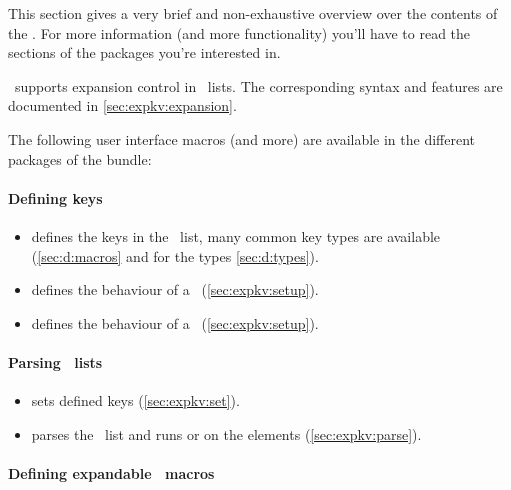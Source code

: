 
This section gives a very brief and non-exhaustive overview over the contents of
the \expkvbundle. For more information (and more functionality) you'll have to
read the sections of the packages you're interested in.

\expkvbundle\ supports expansion control in \kv\ lists. The corresponding
syntax and features are documented in \autoref{sec:expkv:expansion}.

The following user interface macros (and more) are available in the different
packages of the bundle:
\paragraph{Defining keys}
\begin{itemize}
  \item {}\texttt{\kvarg}
    defines the keys in the \kv\ list, many common key types are available
    (\autoref{sec:d:macros} and for the types \autoref{sec:d:types}).
  \item {}
    defines the behaviour of a \Vkey\ (\autoref{sec:expkv:setup}).
  \item {}
    defines the behaviour of a \Nkey\ (\autoref{sec:expkv:setup}).
\end{itemize}
\paragraph{Parsing \kv\ lists}
\begin{itemize}
  \item {}\texttt{\kvarg}
    sets defined keys (\autoref{sec:expkv:set}).
  \item {}\texttt{\kvarg}
    parses the \kv\ list and runs  or  on the
    elements (\autoref{sec:expkv:parse}).
\end{itemize}
\paragraph{Defining expandable \kv\ macros}
